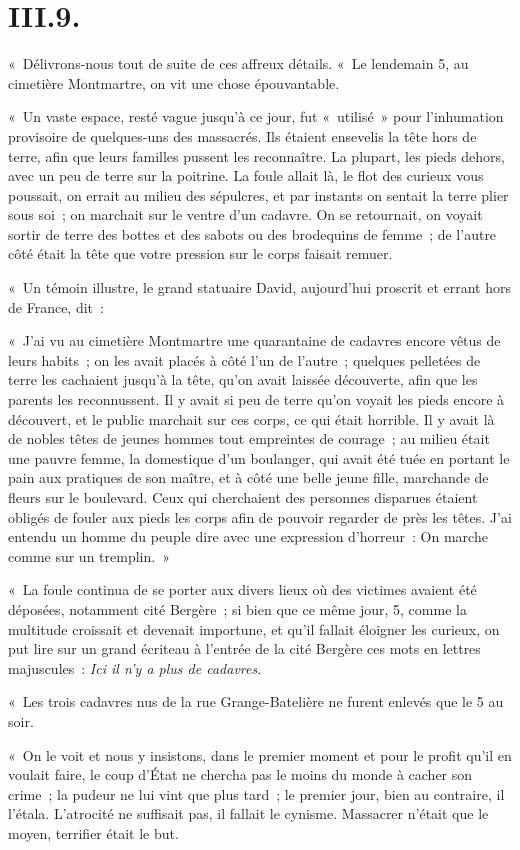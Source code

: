\documentclass[french,twoside]{book} %
\newenvironment{quoteblock}%
  {\begin{quoting}}
  {\end{quoting}}
\newenvironment{quotebar}{%
    \def\FrameCommand{{\color{rubric!10!}\vrule width 0.5em} \hspace{0.9em}}%
    \def\OuterFrameSep{0pt} %
    \MakeFramed {\advance\hsize-\width \FrameRestore}
  }%
  {%
    \endMakeFramed
  }
\renewenvironment{quoteblock}%
  {%
    \savenotes
    \setstretch{0.9}
    \begin{quotebar}
    \smallskip
  }
  {%
    \smallskip
    \end{quotebar}
    \spewnotes
  }
\begin{document}
\section[{III.9.}]{III.9.}

\noindent « Délivrons-nous tout de suite de ces affreux détails. « Le lendemain 5, au cimetière Montmartre, on vit une chose épouvantable.\par
« Un vaste espace, resté vague jusqu’à ce jour, fut « utilisé » pour l’inhumation provisoire de quelques-uns des massacrés. Ils étaient ensevelis la tête hors de terre, afin que leurs familles pussent les reconnaître. La plupart, les pieds dehors, avec un peu de terre sur la poitrine. La foule allait là, le flot des curieux vous poussait, on errait au milieu des sépulcres, et par instants on sentait la terre plier sous soi ; on marchait sur le ventre d’un cadavre. On se retournait, on voyait sortir de terre des bottes et des sabots ou des brodequins de femme ; de l’autre côté était la tête que votre pression sur le corps faisait remuer.\par
« Un témoin illustre, le grand statuaire David, aujourd’hui proscrit et errant hors de France, dit :\par

\begin{quoteblock}
 \noindent « J’ai vu au cimetière Montmartre une quarantaine de cadavres encore vêtus de leurs habits ; on les avait placés à côté l’un de l’autre ; quelques pelletées de terre les cachaient jusqu’à la tête, qu’on avait laissée découverte, afin que les parents les reconnussent. Il y avait si peu de terre qu’on voyait les pieds encore à découvert, et le public marchait sur ces corps, ce qui était horrible. Il y avait là de nobles têtes de jeunes hommes tout empreintes de courage ; au milieu était une pauvre femme, la domestique d’un boulanger, qui avait été tuée en portant le pain aux pratiques de son maître, et à côté une belle jeune fille, marchande de fleurs sur le boulevard. Ceux qui cherchaient des personnes disparues étaient obligés de fouler aux pieds les corps afin de pouvoir regarder de près les têtes. J’ai entendu un homme du peuple dire avec une expression d’horreur : On marche comme sur un tremplin. »
 \end{quoteblock}

\noindent « La foule continua de se porter aux divers lieux où des victimes avaient été déposées, notamment cité Bergère ; si bien que ce même jour, 5, comme la multitude croissait et devenait importune, et qu’il fallait éloigner les curieux, on put lire sur un grand écriteau à l’entrée de la cité Bergère ces mots en lettres majuscules : \emph{Ici il n’y a plus de cadavres}.\par
« Les trois cadavres nus de la rue Grange-Batelière ne furent enlevés que le 5 au soir.\par
« On le voit et nous y insistons, dans le premier moment et pour le profit qu’il en voulait faire, le coup d’État ne chercha pas le moins du monde à cacher son crime ; la pudeur ne lui vint que plus tard ; le premier jour, bien au contraire, il l’étala. L’atrocité ne suffisait pas, il fallait le cynisme. Massacrer n’était que le moyen, terrifier était le but.
\end{document}
